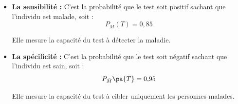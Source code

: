 \begin{methode}
	\begin{itemize}
		\item \textbf{La sensibilité :} C'est la probabilité que le test soit positif sachant que l'individu est malade, soit :
		      \[
			      P_M(T) = 0{,}85
		      \]

		      Elle mesure la capacité du test à détecter la maladie.
		\item \textbf{La spécificité :} C'est la probabilité que le test soit négatif sachant que l'individu est sain, soit :
		      \[
				  P_{\bar{M}}\pa{\bar{T}} = 0{,}95
		      \]

		      Elle mesure la capacité du test à cibler uniquement les personnes malades.
	\end{itemize}
\end{methode}


